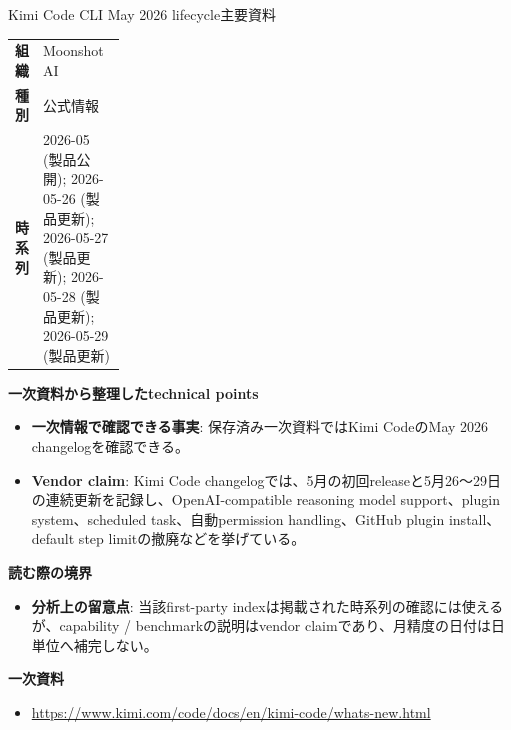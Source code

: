 \begin{technicalnote}{Kimi Code CLI May 2026 lifecycle}{主要資料}
\begingroup
\begin{tabularx}{\linewidth}{@{}>{\bfseries}p{0.22\linewidth}X@{}}
組織 & Moonshot AI \\
種別 & 公式情報 \\
時系列 & 2026-05 (製品公開); 2026-05-26 (製品更新); 2026-05-27 (製品更新); 2026-05-28 (製品更新); 2026-05-29 (製品更新) \\
\end{tabularx}
\smallskip
{\bfseries 一次資料から整理したtechnical points}
\begin{itemize}[leftmargin=1.5em,itemsep=0.35em]
\item \textbf{一次情報で確認できる事実}: 保存済み一次資料ではKimi CodeのMay 2026 changelogを確認できる。
\item \textbf{Vendor claim}: Kimi Code changelogでは、5月の初回releaseと5月26〜29日の連続更新を記録し、OpenAI-compatible reasoning model support、plugin system、scheduled task、自動permission handling、GitHub plugin install、default step limitの撤廃などを挙げている。
\end{itemize}
{\bfseries 読む際の境界}
\begin{itemize}[leftmargin=1.5em,itemsep=0.35em]
\item \textbf{分析上の留意点}: 当該first-party indexは掲載された時系列の確認には使えるが、capability / benchmarkの説明はvendor claimであり、月精度の日付は日単位へ補完しない。
\end{itemize}
\begin{samepage}
{\bfseries 一次資料}
\begingroup\sloppy
\begin{itemize}[leftmargin=1.5em,itemsep=0.25em]
\item {\scriptsize\url{https://www.kimi.com/code/docs/en/kimi-code/whats-new.html}}
\end{itemize}
\endgroup
\end{samepage}
\endgroup
\end{technicalnote}
\medskip

